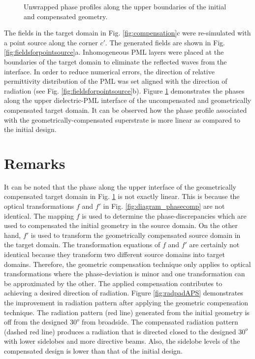 \begin{figure} [t!]

 \begin{center}
 
\end{center}
\caption{Unwrapped phase profiles along the upper boundaries of the initial and compensated geometry.}
\label{fig:phasea2}
\end{figure}
%

The fields in the target domain in Fig. \ref{fig:compensation}c were re-simulated with a point source along the corner $c'$. The generated fields are shown in Fig. \ref{fig:fieldsforpointsource}a. Inhomogeneous PML layers were placed at the boundaries of the target domain to eliminate the reflected waves from the interface. In order to reduce numerical errors, the direction of relative permittivity distribution of the PML was set aligned with the direction of radiation (see Fig. \ref{fig:fieldsforpointsource}b). Figure \ref{fig:phasea2} demonstrates the phases along the upper dielectric-PML interface of the uncompensated and geometrically compensated target domain. It can be observed how the phase profile associated with the geometrically-compensated superstrate is more linear as compared to the initial design. 


\section{Remarks}

It can be noted that the phase along the upper interface of the geometrically compensated target domain in Fig. \ref{fig:phasea2} is not exactly linear. This is because the optical transformations $f$ and $f'$ in Fig. \ref{fig:diagram_phasecomp} are not identical. The mapping $f$ is used to determine the phase-discrepancies which are used to compensated the initial geometry in the source domain. On the other hand, $f'$ is used to transform the geometrically compensated source domain in the target domain. The transformation equations of $f$ and $f'$ are certainly not identical because they transform two different source domains into target domains. Therefore, the geometric compensation technique only applies to optical transformations where the phase-deviation is minor and one transformation can be approximated by the other. The applied compensation contributes to achieving a desired direction of radiation. Figure \ref{fig:radpadAPS} demonstrates the improvement in radiation pattern after applying the geometric compensation technique. The radiation pattern (red line) generated from the initial geometry is off from the designed $30^o$ from broadside. The compensated radiation pattern (dashed red line) produces a radiation that is directed closed to the designed $30^o$ with lower sidelobes and more directive beams. Also, the sidelobe levels of the compensated design is lower than that of the initial design.

